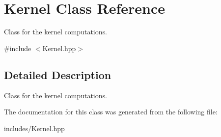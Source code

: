 \hypertarget{class_kernel}{}\section{Kernel Class Reference}
\label{class_kernel}


Class for the kernel computations.  




{\ttfamily \#include $<$Kernel.\+hpp$>$}



\subsection{Detailed Description}
Class for the kernel computations. 

The documentation for this class was generated from the following file\+:\begin{DoxyCompactItemize}
\item 
includes/Kernel.\+hpp\end{DoxyCompactItemize}
